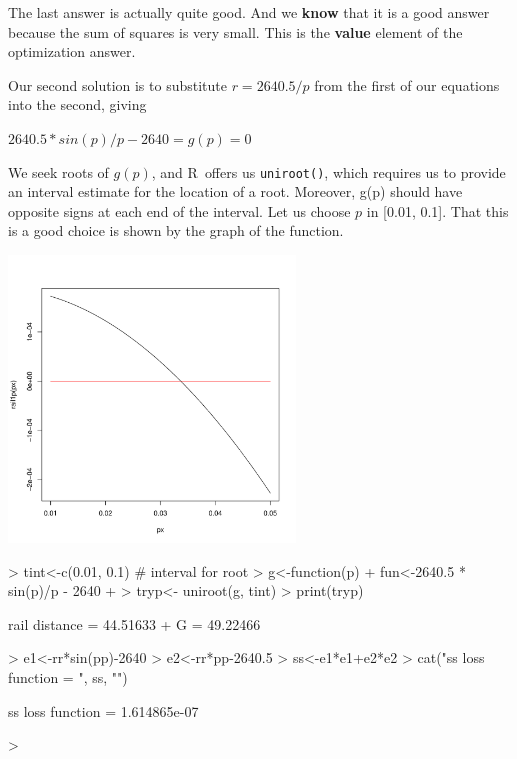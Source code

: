 \documentclass[11pt,letterpaper]{article}
\newcommand{\R}{{\sf R\ }}
\begin{document}
The last answer is actually quite good. And we \textbf{know} that it is a good
answer because the sum of squares is very small. This is the \textbf{value} element
of the optimization answer.

Our second solution is to substitute $ r = 2640.5/p $ from the first of our equations
into the second, giving

$ 2640.5 * sin(p)/p - 2640 = g(p) = 0 $

We seek roots of $g(p)$, and \R   offers us \texttt{uniroot()}, which requires us to 
provide an interval estimate for the location of a root. Moreover, g(p) should have 
opposite signs at each end of the interval. Let us choose $p$ in [0.01, 0.1]. That 
this is a good choice is shown by the graph of the function.

\includegraphics[height=3in]{rail1p.pdf}

\begin{Schunk}
\begin{Sinput}
> tint<-c(0.01, 0.1) # interval for root
> g<-function(p) {
+  fun<-2640.5 * sin(p)/p - 2640
+ }
> tryp<- uniroot(g, tint)
> print(tryp)
\end{Sinput}
\begin{Soutput}
rail distance =  44.51633  + G = 49.22466 
\end{Soutput}
\begin{Sinput}
> e1<-rr*sin(pp)-2640
> e2<-rr*pp-2640.5
> ss<-e1*e1+e2*e2
> cat("ss loss function = ", ss, "\n")
\end{Sinput}
\begin{Soutput}
ss loss function =  1.614865e-07 
\end{Soutput}
\begin{Sinput}
> 
\end{Sinput}
\end{Schunk}
\end{document}
